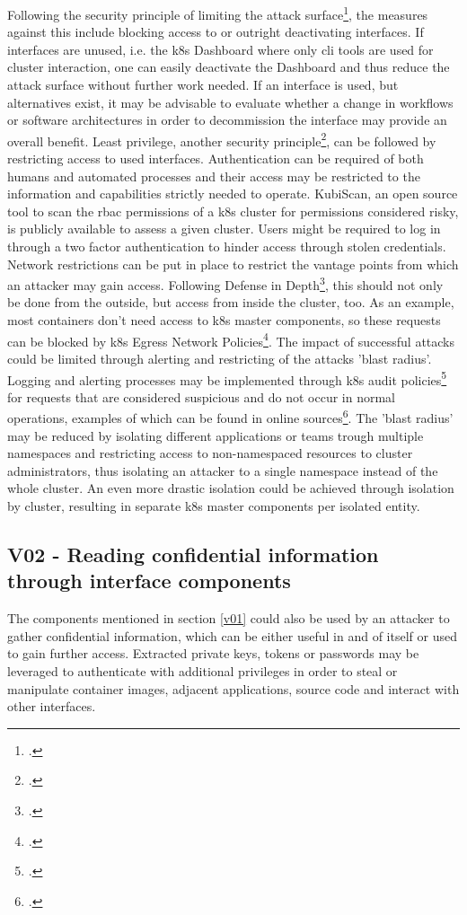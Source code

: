 Following the security principle of limiting the attack surface\footcite[][, p. 4 to 5]{k8sBook}, the measures against this include blocking access to or outright deactivating interfaces. If interfaces are unused, i.e. the \gls{k8s} Dashboard where only \gls{cli} tools are used for cluster interaction, one can easily deactivate the Dashboard and thus reduce the attack surface without further work needed. If an interface is used, but alternatives exist, it may be advisable to evaluate whether a change in workflows or software architectures in order to decommission the interface may provide an overall benefit.
Least privilege, another security principle\footcite[][, p. 3 to 4]{k8sBook}, can be followed by restricting access to used interfaces. Authentication can be required of both humans and automated processes and their access may be restricted to the information and capabilities strictly needed to operate. KubiScan, an open source tool to scan the \gls{rbac} permissions of a \gls{k8s} cluster for permissions considered risky, is publicly available to assess a given cluster. Users might be required to log in through a two factor authentication to hinder access through stolen credentials. Network restrictions can be put in place to restrict the vantage points from which an attacker may gain access.
Following Defense in Depth\footcite[][, p. 3]{k8sBook}, this should not only be done from the outside, but access from inside the cluster, too. As an example, most containers don't need access to \gls{k8s} master components, so these requests can be blocked by \gls{k8s} Egress Network Policies\footcite[][, section 'The NetworkPolicy Resource']{egressNetPol}. The impact of successful attacks could be limited through alerting and restricting of the attacks 'blast radius'. Logging and alerting processes may be implemented through \gls{k8s} audit policies\footcite[][, section 'Audit Policy']{auditPolicy} for requests that are considered suspicious and do not occur in normal operations, examples of which can be found in online sources\footcite[][, section 'Alerting on the Kubernetes infrastructure']{sysdigMonitoring}. The 'blast radius' may be reduced by isolating different applications or teams trough multiple namespaces and restricting access to non-namespaced resources to cluster administrators, thus isolating an attacker to a single namespace instead of the whole cluster. An even more drastic isolation could be achieved through isolation by cluster, resulting in separate \gls{k8s} master components per isolated entity.

\subsection{V02 - Reading confidential information through interface components}
The components mentioned in section \ref{v01} could also be used by an attacker to gather confidential information, which can be either useful in and of itself or used to gain further access. Extracted private keys, tokens or passwords  may be leveraged to authenticate with additional privileges in order to steal or manipulate container images, adjacent applications, source code and interact with other interfaces.

